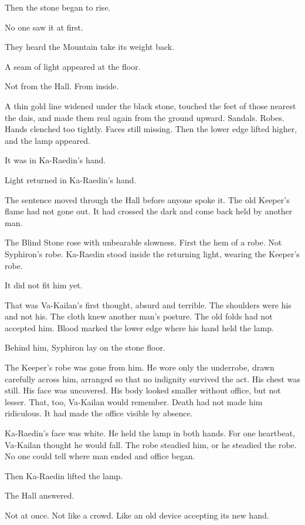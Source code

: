 Then the stone began to rise.\par
No one saw it at first.\par
They heard the Mountain take its weight back.\par
A seam of light appeared at the floor.\par
Not from the Hall.
From inside.\par
A thin gold line widened under the black stone, touched the feet of those nearest the dais, and made them real again from the ground upward.
Sandals.
Robes.
Hands clenched too tightly.
Faces still missing.
Then the lower edge lifted higher, and the lamp appeared.\par
It was in Ka-Raedin’s hand.\par
Light returned in Ka-Raedin’s hand.\par
The sentence moved through the Hall before anyone spoke it.
The old Keeper’s flame had not gone out.
It had crossed the dark and come back held by another man.\par
The Blind Stone rose with unbearable slowness.
First the hem of a robe.
Not Syphiron’s robe.
Ka-Raedin stood inside the returning light, wearing the Keeper’s robe.\par
It did not fit him yet.\par
That was Va-Kailan’s first thought, absurd and terrible.
The shoulders were his and not his.
The cloth knew another man’s posture.
The old folds had not accepted him.
Blood marked the lower edge where his hand held the lamp.\par
Behind him, Syphiron lay on the stone floor.\par
The Keeper’s robe was gone from him.
He wore only the underrobe, drawn carefully across him, arranged so that no indignity survived the act.
His chest was still.
His face was uncovered.
His body looked smaller without office, but not lesser.
That, too, Va-Kailan would remember.
Death had not made him ridiculous.
It had made the office visible by absence.\par
Ka-Raedin’s face was white.
He held the lamp in both hands.
For one heartbeat, Va-Kailan thought he would fall.
The robe steadied him, or he steadied the robe.
No one could tell where man ended and office began.\par
Then Ka-Raedin lifted the lamp.\par
The Hall answered.\par
Not at once.
Not like a crowd.
Like an old device accepting its new hand.\par
